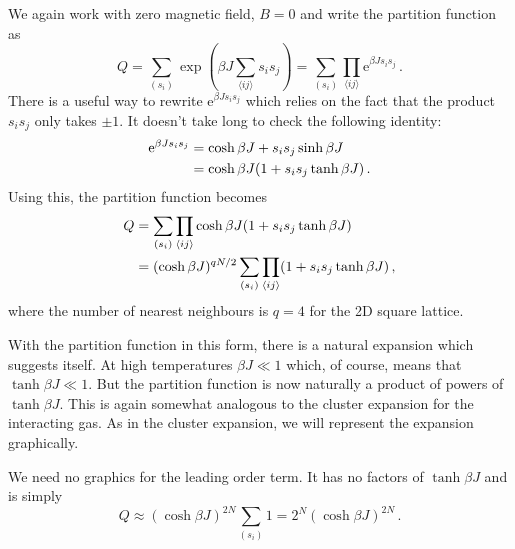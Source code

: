 \documentclass{article}
\theoremstyle{plain}\theoremheaderfont{\normalfont\bfseries}\theorembodyfont{\rmfamily}\theoremseparator{.}\newtheorem*{thm}{Theorem}\newtheorem*{law}{Law}\newtheorem*{pos}{Postulate}
\numberwithin{equation}{section}
\newcommand{\ee}{\mathrm{e}}
\begin{document}
    We again work with zero magnetic field, \(B=0\) and write the partition function as
    \begin{equation}
        Q=\sum_{(s_i)}\exp\left(\beta J\sum_{\langle ij\rangle}s_i s_j\right)=\sum_{(s_i)}\prod_{\langle ij\rangle}\ee^{\beta Js_i s_j}\,.
    \end{equation}
    There is a useful way to rewrite \(\ee^{\beta Js_is_j}\) which relies on the fact that the product \(s_i s_j\) only takes \(\pm 1\). It doesn't take long to check the following identity:
    \begin{align}
        \ee^{\beta Js_is_j}&=\cosh\beta J+s_i s_j\sinh\beta J\notag \\
        &=\cosh\beta J(1+s_is_j\tanh\beta J)\,.
    \end{align}
    Using this, the partition function becomes
    \begin{align}
        Q&=\sum_{(s_i)}\prod_{\langle ij\rangle}\cosh\beta J(1+s_is_j\tanh\beta J)\notag\\
        &=(\cosh\beta J)^{qN/2}\sum_{(s_i)}\prod_{\langle ij\rangle}(1+s_is_j\tanh\beta J)\,,\label{Ising_high_T_partition_function}
    \end{align}
    where the number of nearest neighbours is \(q=4\) for the 2D square lattice.

    With the partition function in this form, there is a natural expansion which suggests itself. At high temperatures \(\beta J\ll 1\) which, of course, means that \(\tanh\beta J\ll 1\). But the partition function is now naturally a product of powers of \(\tanh\beta J\). This is again somewhat analogous to the cluster expansion for the interacting gas. As in the cluster expansion, we will represent the expansion graphically.

    We need no graphics for the leading order term. It has no factors of \(\tanh \beta J\) and is simply
    \begin{equation}
        Q\approx(\cosh\beta J)^{2N}\sum_{(s_i)}1=2^N(\cosh\beta J)^{2N}\,.
    \end{equation}
\end{document}
